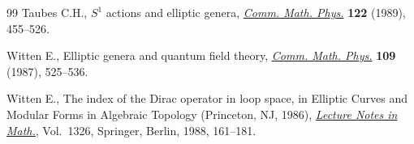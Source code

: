 \documentclass[pdftex]{sigma}
\numberwithin{equation}{section}
\begin{document}
\begin{thebibliography}{99}
Taubes C.H., {$S^1$} actions and elliptic genera, \href{https://doi.org/10.1007/BF01238437}{\textit{Comm. Math. Phys.}}
 \textbf{122} (1989), 455--526.

Witten E., Elliptic genera and quantum f\/ield theory, \href{https://doi.org/10.1007/BF01208956}{\textit{Comm. Math. Phys.}}
 \textbf{109} (1987), 525--536.

Witten E., The index of the {D}irac operator in loop space, in Elliptic Curves
 and Modular Forms in Algebraic Topology ({P}rinceton, {NJ}, 1986),
 \href{https://doi.org/10.1007/BFb0078045}{\textit{Lecture Notes in Math.}}, Vol.~1326, Springer, Berlin, 1988, 161--181.

\end{thebibliography}\LastPageEnding
\end{document}
